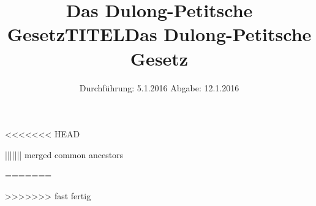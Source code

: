 

<<<<<<< HEAD
\subject{V201}
\title{Das Dulong-Petitsche Gesetz}
||||||| merged common ancestors
\subject{VERSUCH NUMMER}
\title{TITEL}
=======
\subject{VERSUCH NUMMER 201}
\title{Das Dulong-Petitsche Gesetz}
>>>>>>> fast fertig
\date{
  Durchführung: 5.1.2016
  \hspace{3em}
  Abgabe: 12.1.2016
}



\maketitle
\thispagestyle{empty}
\tableofcontents
\newpage








\printbibliography


